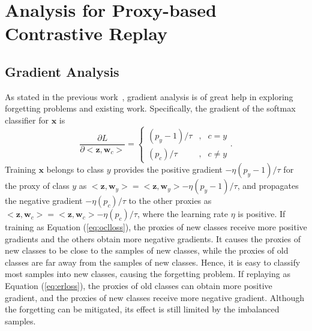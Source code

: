

\section{Analysis for Proxy-based Contrastive Replay}

\subsection{Gradient Analysis}
As stated in the previous work~\cite{Lin_2023_CVPR}, gradient analysis is of great help in exploring forgetting problems and existing work. Specifically, the gradient of the softmax classifier for $\bm{x}$ is
\begin{equation}
    \label{eq:gradient_h}
    \frac{\partial L}{\partial <\bm{z},\bm{w}_c>}=\left\{
    \begin{aligned}
        (p_y-1)/\tau&,&c= y \\
        (p_c)/\tau&,&c\neq y
    \end{aligned}
    \right..
\end{equation}
Training $\bm{x}$ belongs to class $y$ provides the positive gradient $-\eta(p_y-1)/\tau$ for the proxy of class $y$ as $<\bm{z},\bm{w}_y>=<\bm{z},\bm{w}_y>-\eta(p_y-1)/\tau$, and propagates the negative gradient $-\eta(p_c)/\tau$ to the other proxies as $<\bm{z},\bm{w}_c>=<\bm{z},\bm{w}_c>-\eta(p_c)/\tau$, where the learning rate $\eta$ is positive. If training as Equation (\ref{eq:oclloss}), the proxies of new classes receive more positive gradients and the others obtain more negative gradients. It causes the proxies of new classes to be close to the samples of new classes, while the proxies of old classes are far away from the samples of new classes. Hence, it is easy to classify most samples into new classes, causing the forgetting problem. If replaying as Equation (\ref{eq:erloss}), the proxies of old classes can obtain more positive gradient, and the proxies of new classes receive more negative gradient. Although the forgetting can be mitigated, its effect is still limited by the imbalanced samples.  

